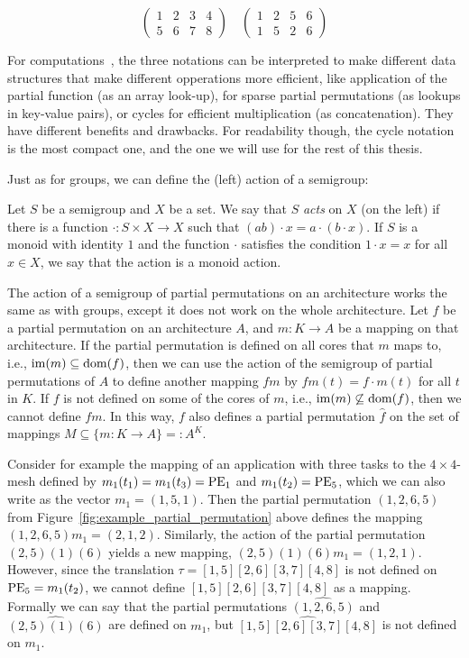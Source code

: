\begin{equation*}
\left(
\begin{array}{llll}
1 & 2 & 3 & 4 \\
5 & 6 & 7 & 8 
\end{array}
\right)
\quad
\left(
\begin{array}{llll}
1 & 2 & 5 & 6 \\
1 & 5 & 2 & 6
\end{array}
\right)
\end{equation*}

For computations~\cite{east2019semigroups}, the three notations can be interpreted to make different data structures that make different opperations more efficient, like application of the partial function (as an array look-up), for sparse partial permutations (as lookups in key-value pairs), or cycles for efficient multiplication (as concatenation). They have different benefits and drawbacks. For readability though, the cycle notation is the most compact one, and the one we will use for the rest of this thesis.

Just as for groups, we can define the (left) action of a semigroup:
\begin{defn}
Let $S$ be a semigroup and $X$ be a set. We say that $S$ \emph{acts} on $X$ (on the left) if there is a function $\cdot : S \times X \rightarrow X$ such that $(ab) \cdot x = a \cdot (b \cdot x)$. If $S$ is a monoid with identity $1$ and the function $\cdot$ satisfies the condition $1 \cdot x = x$ for all $x \in X$, we say that the action is a monoid action.
\end{defn}

The action of a semigroup of partial permutations on an architecture works the same as with groups, except it does not work on the whole architecture.
Let $f$ be a partial permutation on an architecture $A$, and $m : K \rightarrow A$ be a mapping on that architecture.
If the partial permutation is defined on all cores that $m$ maps to, i.e., $\operatorname{im}(m) \subseteq \operatorname{dom}(f)$, then we can use the action of the semigroup of partial permutations of $A$ to define another mapping $fm$ by $fm(t) = f \cdot m(t)$ for all $t$ in $K$.
If $f$ is not defined on some of the cores of $m$, i.e., $\operatorname{im}(m) \not \subseteq \operatorname{dom}(f)$, then we cannot define $fm$. In this way, $f$ also defines a partial permutation $\hat f$ on the set of mappings $M \subseteq \{ m : K \rightarrow A \} =: A^K$.

Consider for example the mapping of an application with three tasks to the $4 \times 4$-mesh defined by $m_1(t_1) = m_1(t_3) = \operatorname{PE}_1$ and $m_1(t_2) = \operatorname{PE}_5$, which we can also write as the vector $m_1 = (1,5,1)$.
Then the partial permutation $(1,2,6,5)$ from Figure~\ref{fig:example_partial_permutation} above defines the mapping $(1,2,6,5)m_1 = (2,1,2)$.
Similarly, the action of the partial permutation $(2,5)(1)(6)$ yields a new mapping, $(2,5)(1)(6)m_1 = (1,2,1)$.
However, since the translation $\tau = [1,5][2,6][3,7][4,8]$ is not defined on $\operatorname{PE}_5 = m_1(t_2)$, we cannot define $[1,5][2,6][3,7][4,8]$ as a mapping.
Formally we can say that the partial permutations $\widehat{(1,2,6,5)}$ and $\widehat{(2,5)(1)(6)}$ are defined on $m_1$, but $\widehat{[1,5][2,6][3,7][4,8]}$ is not defined on $m_1$.

